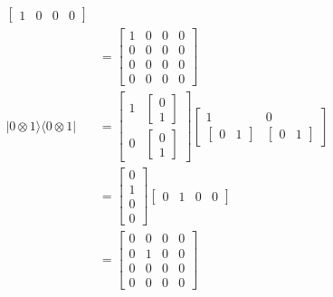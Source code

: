 \documentclass[main.tex]{subfiles}
\begin{document}
\begin{enumerate}
\begin{enumerate}
\begin{align*}
                                                    \left[\begin{array}{llll} 1 & 0 & 0 & 0 \end{array}\right]\\
                                                    & = \left[\begin{array}{llll} 1&0&0&0\\0&0&0&0\\0&0&0&0\\0&0&0&0\end{array}\right]\\
            |0 \otimes 1\rangle\langle 0 \otimes 1| & = \left[\begin{array}{ll} 1 & {\left[\begin{array}{l} 0 \\ 1 \end{array}\right]} \\
                                                    0 & {\left[\begin{array}{l} 0 \\ 1 \end{array}\right]} \end{array}\right]
                                                    \left[\begin{array}{ll} 1 & 0 \\
                                                    {\left[\begin{array}{ll} 0 & 1 \end{array}\right]} & 
                                                    {\left[\begin{array}{ll} 0 & 1 \end{array}\right]} \end{array}\right]\\
                                                    & = \left[\begin{array}{l} 0 \\ 1 \\ 0 \\ 0 \end{array}\right]
                                                    \left[\begin{array}{llll} 0 & 1 & 0 & 0 \end{array}\right]\\
                                                    & = \left[\begin{array}{llll} 0&0&0&0\\0&1&0&0\\0&0&0&0\\0&0&0&0\end{array}\right]\\

\end{align*}
\end{enumerate}
\end{enumerate}
\end{document}
